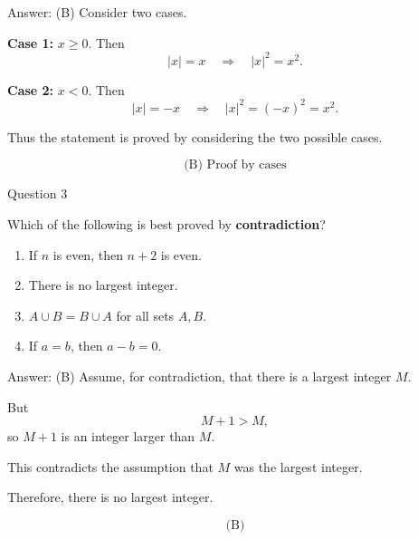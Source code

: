 \documentclass[aspectratio=169,11pt]{beamer}
\begin{document}
\begin{frame}

\begin{block}{Answer: (B)}
Consider two cases.

\textbf{Case 1:} $x\geq0$.
Then
$$
|x|=x\quad\Rightarrow\quad |x|^2=x^2.
$$

\textbf{Case 2:} $x<0$.
Then
$$
|x|=-x\quad\Rightarrow\quad |x|^2=(-x)^2=x^2.
$$

Thus the statement is proved by considering the two possible cases.

$$
\boxed{\text{(B) Proof by cases}}
$$
\end{block}

\end{frame}

\begin{frame}{Question 3}

Which of the following is best proved by \textbf{contradiction}?

\begin{enumerate}
    \item[(A)] If $n$ is even, then $n+2$ is even.
    \item[(B)] There is no largest integer.
    \item[(C)] $A\cup B=B\cup A$ for all sets $A,B$.
    \item[(D)] If $a=b$, then $a-b=0$.
\end{enumerate}

\end{frame}

\begin{frame}

\begin{block}{Answer: (B)}
Assume, for contradiction, that there is a largest integer $M$.

But
$$
M+1>M,
$$
so $M+1$ is an integer larger than $M$.

This contradicts the assumption that $M$ was the largest integer.

Therefore, there is no largest integer.

$$
\boxed{\text{(B)}}
$$
\end{block}

\end{frame}
\end{document}
